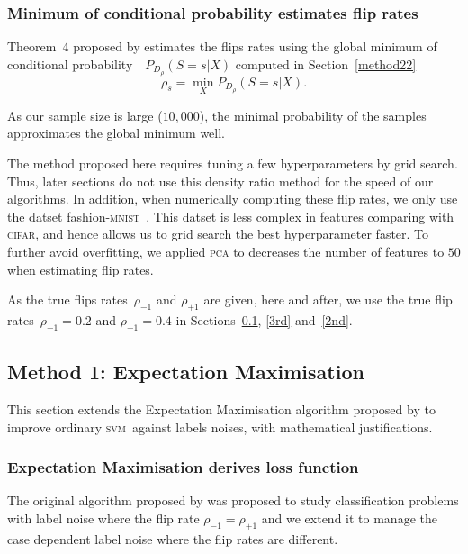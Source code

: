 \documentclass[12pt]{article} %
\newcommand{\svm}{\textsc{svm}}
\newcommand{\rhoo}{\rho_{+1}}
\newcommand{\rhoz}{\rho_{-1}}
\newcommand{\mnist}{fashion-\textsc{mnist}\ }
\begin{document}
\subsubsection{Minimum of conditional probability estimates flip rates}\label{method23}
Theorem~4 proposed by \citet{liu2016classification} estimates the flips rates using the global minimum of conditional probability~~$P_{D_\rho}(S=s|X)$ computed in Section~\ref{method22}
\begin{equation*}\label{eq:fliprate}
\rho_s=\min _X P_{D_\rho}(S=s|X).
\end{equation*}

As our sample size is large ($10,000$), the minimal probability of the samples approximates the global minimum well.

The method proposed here requires tuning a few hyperparameters by grid search. Thus, later sections do not use this density ratio method for the speed of our algorithms.
In addition, when numerically computing these flip rates, we only use the datset \mnist. This datset is less complex in features comparing with \textsc{cifar}, and hence allows us to grid search the best hyperparameter faster. To further avoid overfitting, we applied \textsc{pca} to decreases the number of features to $50$ when estimating flip rates.

As the true flips rates~$\rhoz$ and $\rhoo$ are given, here and after, we use the true flip rates~$\rhoz=0.2$ and $\rhoo=0.4$ in Sections~\ref{1st}, \ref{3rd} and~\ref{2nd}.


\subsection{Method 1: Expectation Maximisation}\label{1st}
This section extends the Expectation Maximisation algorithm proposed by \citet{pmlr-v20-biggio11} to improve ordinary \svm\ against labels noises, with mathematical justifications.
\subsubsection{Expectation Maximisation derives loss function}
The original algorithm proposed by \citet{pmlr-v20-biggio11} was proposed to study classification problems with label noise where the flip rate $\rhoz=\rhoo$ and we extend it to manage the case dependent label noise where the flip rates are different.
\end{document}
